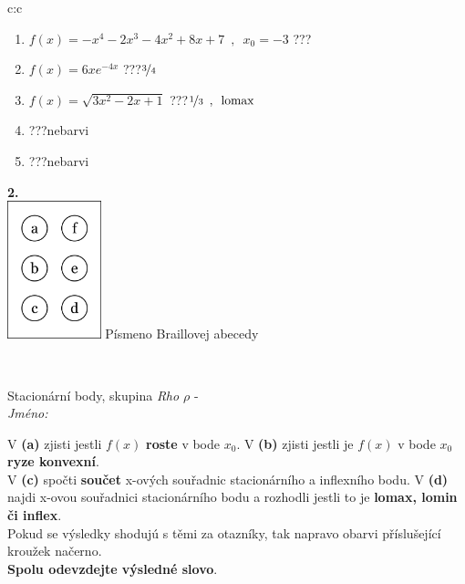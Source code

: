 \documentclass[10pt]{report}
\begin{document}
\begin{tabular}{c:c}
\begin{minipage}[c][104.5mm][t]{0.5\linewidth}
\begin{center}
\begin{minipage}{0.79\linewidth}
\begin{center}
\begin{varwidth}{\linewidth}
\begin{enumerate}
\item $f(x)=-x^4-2x^3-4x^2+8x+7\enspace , \enspace x_0=-3$\quad \dotfill\; ???\;\dotfill \quad {}
\item $f(x)=6xe^{-4x}$\quad \dotfill\; ???\;\dotfill \quad $\nicefrac{3}{4}$
\item $f(x)=\sqrt{3x^2-2x+1}$\quad \dotfill\; ???\;\dotfill \quad $\nicefrac{1}{3}\enspace , \enspace\mathrm{lomax}$
\item \quad \dotfill\; ???\;\dotfill \quad nebarvi
\item \quad \dotfill\; ???\;\dotfill \quad nebarvi
\end{enumerate}
\end{varwidth}
\end{center}
\end{minipage}
\begin{minipage}{0.20\linewidth}
\begin{center}
{\Huge\bfseries 2.} \\[2mm]
\includegraphics[height=40mm]{../images/braille.png}
{\small Písmeno Braillovej abecedy}
\end{center}
\end{minipage}
\end{center}
\end{minipage}
\\ \hdashline
\begin{minipage}[c][104.5mm][t]{0.5\linewidth}
\begin{center}
\vspace{7mm}
{\huge Stacionární body, skupina \textit{Rho $\rho$} -}\\[5mm]
\textit{Jméno:}\phantom{xxxxxxxxxxxxxxxxxxxxxxxxxxxxxxxxxxxxxxxxxxxxxxxxxxxxxxxxxxxxxxxxx}\\[5mm]
\begin{minipage}{0.95\linewidth}
\begin{center}
{\small V \textbf{(a)} zjisti jestli $f(x)$ \textbf{roste} v bode $x_0$. V \textbf{(b)} zjisti jestli je $f(x)$ v bode $x_0$ \textbf{ryze konvexní}.\\V \textbf{(c)} spočti \textbf{součet} x-ových souřadnic stacionárního a inflexního bodu. V \textbf{(d)} najdi x-ovou souřadnici stacionárního bodu a rozhodli jestli to je \textbf{lomax, lomin či inflex}.\\Pokud se výsledky shodujú s těmi za otazníky, tak napravo obarvi příslušející kroužek načerno.\\\textbf{Spolu odevzdejte výsledné slovo}}.

\end{center}
\end{minipage}
\end{center}
\end{minipage}
\end{tabular}
\end{document}
